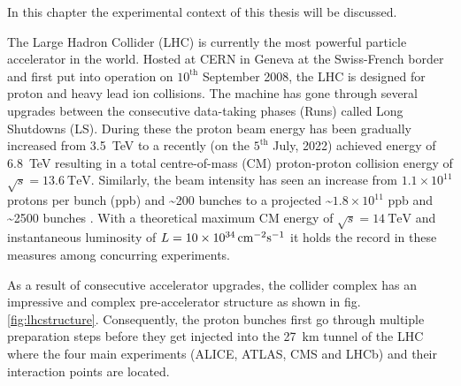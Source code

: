 \label{ch:experiment}

In this chapter the experimental context of this thesis will be discussed. 

\label{sec:theory}

The Large Hadron Collider (LHC) is currently the most powerful particle accelerator in the world. Hosted at CERN in Geneva at the Swiss-French border and first put into operation on $\text{10}^\text{th}$ September 2008, the LHC is designed for proton and heavy lead ion collisions. The machine has gone through several upgrades between the consecutive data-taking phases (Runs) called Long Shutdowns (LS). During these the proton beam energy has been gradually increased from \SI{3.5}{\tera\electronvolt} to a recently (on the $\text{5}^{\text{th}}$ July, 2022) achieved energy of \SI{6.8}{\tera\electronvolt} \cite{Alici:2773265} resulting in a total centre-of-mass (CM) proton-proton collision energy of $\sqrt{s} = \SI{13.6}{\tera\electronvolt}$. Similarly, the beam intensity has seen an increase from $1.1 \times 10^{11}$ protons per bunch (ppb) and \textasciitilde200 bunches to a projected \textasciitilde$1.8 \times 10^{11}$ ppb and \textasciitilde2500 bunches \cite{Fartoukh:2790409, Karastathis:2750302}. With a theoretical maximum CM energy of $\sqrt{s} = \SI{14}{\tera\electronvolt}$ and instantaneous luminosity of $L = \SI{10d34}{\centi\meter^{-2}\second^{-1}}$ it holds the record in these measures among concurring experiments.

As a result of consecutive accelerator upgrades, the collider complex has an impressive and complex pre-accelerator structure as shown in fig. \ref{fig:lhcstructure}. Consequently, the proton bunches first go through multiple preparation steps before they get injected into the \SI{27}{\kilo\meter} tunnel of the LHC where the four main experiments (ALICE, ATLAS, CMS and LHCb) and their interaction points are located. 

